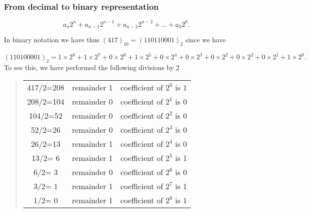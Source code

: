 \documentclass{beamer}
\newenvironment{block_mdfboxadmon}[1][]{\begin{block}{#1}}{\end{block}}
\begin{document}
\begin{frame}
\frametitle{From decimal to binary representation}

\begin{block_mdfboxadmon}[How to do it.]
\[
  a_n2^n+a_{n-1}2^{n-1}  +a_{n-2}2^{n-2}  +\dots +a_{0}2^{0}.
\]

In binary notation we have thus $(417)_{10} =(110110001)_2$
since we have

\[
(110100001)_2
=1\times2^8+1\times 2^{7}+0\times 2^{6}+1\times 2^{5}+0\times 2^{4}+0\times 2^{3}+0\times 2^{2}+0\times 2^{2}+0\times 2^{1}+1\times 2^{0}.
\]
To see this, we have performed the following divisions by 2




\begin{quote}
\begin{tabular}{ccc}
\hline
 \\
\hline
417/2=208                   & remainder 1                 & coefficient of $2^{0}$ is 1 \\
208/2=104                   & remainder 0                 & coefficient of $2^{1}$ is 0 \\
104/2=52                    & remainder 0                 & coefficient of $2^{2}$ is 0 \\
52/2=26                     & remainder 0                 & coefficient of $2^{3}$ is 0 \\
26/2=13                     & remainder 1                 & coefficient of $2^{4}$ is 0 \\
13/2= 6                     & remainder 1                 & coefficient of $2^{5}$ is 1 \\
6/2= 3                      & remainder 0                 & coefficient of $2^{6}$ is 0 \\
3/2= 1                      & remainder 1                 & coefficient of $2^{7}$ is 1 \\
1/2= 0                      & remainder 1                 & coefficient of $2^{8}$ is 1 \\
\hline
\end{tabular}
\end{quote}

\noindent
\end{block_mdfboxadmon}
\end{frame}
\end{document}
